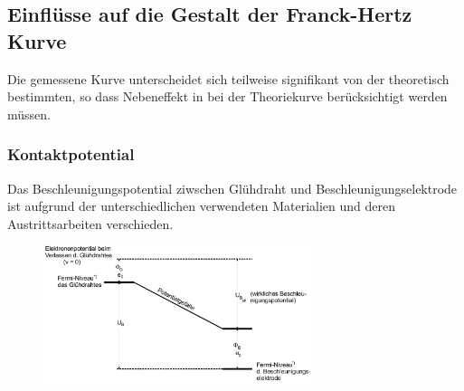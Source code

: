 \subsection{Einflüsse auf die Gestalt der Franck-Hertz Kurve}
\label{sec:Einflüsse}
Die gemessene Kurve unterscheidet sich teilweise signifikant von der theoretisch bestimmten, so dass Nebeneffekt
in bei der Theoriekurve berücksichtigt werden müssen.

\subsubsection{Kontaktpotential}
\label{Kontaktpotential}
Das Beschleunigungspotential ziwschen Glühdraht und Beschleunigungselektrode ist aufgrund der unterschiedlichen
verwendeten Materialien und deren Austrittsarbeiten verschieden.
\begin{figure}
    \centering
    \includegraphics[width=0.7\textwidth]{Bilder/Kontaktpotential.png}
\end{figure}